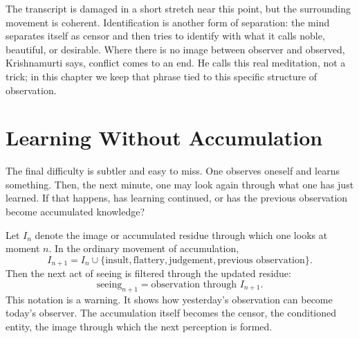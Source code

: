 \begin{figure}
\centering
{}
\end{figure}

The transcript is damaged in a short stretch near this point, but the surrounding movement is coherent. Identification is another form of separation: the mind separates itself as censor and then tries to identify with what it calls noble, beautiful, or desirable. Where there is no image between observer and observed, Krishnamurti says, conflict comes to an end. He calls this real meditation, not a trick; in this chapter we keep that phrase tied to this specific structure of observation.

\section{Learning Without Accumulation}

The final difficulty is subtler and easy to miss. One observes oneself and learns something. Then, the next minute, one may look again through what one has just learned. If that happens, has learning continued, or has the previous observation become accumulated knowledge?

Let $I_n$ denote the image or accumulated residue through which one looks at moment $n$. In the ordinary movement of accumulation,
\begin{equation}
I_{n+1}
=
I_n
\cup
\{\text{insult},\text{flattery},\text{judgement},\text{previous observation}\}.
\end{equation}
Then the next act of seeing is filtered through the updated residue:
\begin{equation}
\text{seeing}_{n+1}
=
\text{observation through } I_{n+1}.
\end{equation}
This notation is a warning. It shows how yesterday's observation can become today's observer. The accumulation itself becomes the censor, the conditioned entity, the image through which the next perception is formed.


